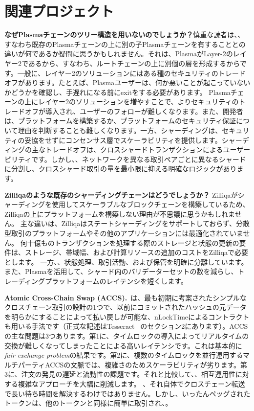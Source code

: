 \section{関連プロジェクト}
\textbf{なぜPlasmaチェーンのツリー構造を用いないのでしょうか？}慎重な読者は、、すなわち既存のPlasmaチェーンの上に別の子Plasmaチェーンを有することとの違いが何であるか疑問に思うかもしれません。それは、PlasmaがLayer-2のレイヤー2であるから、すなわち、ルートチェーンの上に別個の層を形成するからです。一般に、レイヤー2のソリューションにはある種のセキュリティのトレードオフがあります。たとえば、Plasmaユーザーは、何か悪いことが起こっていないかどうかを確認し、手遅れになる前にexitをする必要があります。 Plasmaチェーンの上にレイヤー2のソリューションを増やすことで、よりセキュリティのトレードオフが導入され、ユーザーのフォローが難しくなります。また、開発者は、プラットフォームを構築するか、プラットフォームのセキュリティ保証について理由を判断することも難しくなります。一方、シャーディングは、セキュリティの妥協をせずにコンセンサス層でスケーラビリティを提供します。シャーディングの主なトレードオフは、クロスシャードトランザクションによるユーザービリティです。しかし、、ネットワークを異なる取引ペアごとに異なるシャードに分割し、クロスシャード取引の量を最小限に抑える明確なロジックがあります。

\textbf{Zilliqaのような既存のシャーディングチェーンはどうでしょうか？ } Zilliqaがシャーディングを使用してスケーラブルなブロックチェーンを構築しているため、Zilliqaの上にプラットフォームを構築しない理由が不思議に思うかもしれません。 主な違いは、Zilliqaはステートシャーディングをサポートしておらず、分散型取引のプラットフォームやその他のアプリケーションには最適化されていません。 何十億ものトランザクションを処理する際のストレージと状態の更新の要件は、ストレージ、帯域幅、および計算リソースの追加のコストをZilliqaで必要とします。 一方、、状態処理、取引活動、および保管を明確に分離しています。 また、Plasmaを活用して、シャード内のバリデーターセットの数を減らし、トレーディングプラットフォームのレイテンシを短くします。

\textbf{Atomic Cross-Chain Swap (ACCS).}~\cite{atomic-swap-wiki}は、最も初期に考案されたシンプルなクロスチェーン取引の設計の1つで、以前にコミットされたハッシュの元データを明らかにすることによって払い戻しが可能な、nLockTimeによるコントラクトも用いる手法です（正式な記述はTesseract ~\cite{tesseract}のセクション2にあります）。ACCSの主な問題は3つあります。第1に、タイムロックの導入によってリアルタイムの交換が難しくなってしまったことによる高いレイテンシです。これは基本的に\textit{fair exchange problem}\cite{fair-exchange-impossibility}の結果です。第2に、複数のタイムロックを並行運用するマルチパーティACCSの文脈では、複雑さのためスケーラビリティが劣ります。第3に、注文の発見の遅延と流動性の課題です。それと比較して、、相互運用性に対する複雑なアプローチを大幅に削減します。 、それ自体でクロスチェーン転送で長い待ち時間を解決するわけではありません。しかし、いったんペッグされたトークンは、他のトークンと同様に簡単に取引され、。

